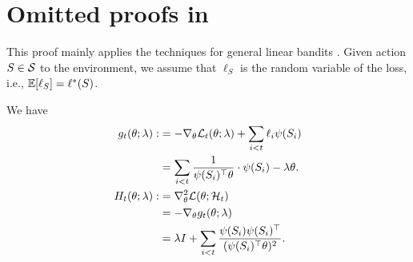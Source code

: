 \section{Omitted proofs in }\label{Appendix:k-min}
This proof mainly applies the techniques for general linear bandits \citet{liu2024almost, lee2024unified}. Given action $S \in {\mathcal{S}}$ to the environment, we assume that $\ell_S$ is the random variable of the loss, i.e., $\mathbb{E}[\ell_S] = \ell^*(S)$. 

We have
\begin{align*}
    g_t(\theta; \lambda) :&= - \nabla_\theta {\mathcal{L}}_t(\theta; \lambda) + \sum_{i < t} \ell_i \psi(S_i) \\
    &=  \sum_{i < t}  \frac{1}{\psi(S_i)^\top \theta} \cdot \psi(S_i) - \lambda \theta. \\
    H_t(\theta;\lambda) :&= \nabla^2_\theta {\mathcal{L}}(\theta; {\mathcal{H}}_t)\\
    &=  - \nabla_\theta g_t(\theta; \lambda)  \\
    &= \lambda I + \sum_{i < t} \frac{\psi(S_i)\psi(S_i)^\top}{(\psi(S_i)^\top\theta)^2}.
\end{align*}
